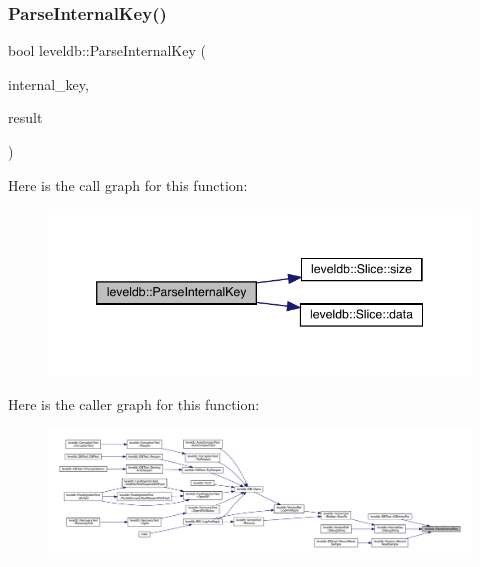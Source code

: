 \subsubsection{\texorpdfstring{ParseInternalKey()}{ParseInternalKey()}}
{\footnotesize\ttfamily bool leveldb\+::\+Parse\+Internal\+Key (\begin{DoxyParamCaption}\item[{const \mbox{\hyperlink{classleveldb_1_1_slice}{Slice}} \&}]{internal\+\_\+key,  }\item[{\mbox{\hyperlink{structleveldb_1_1_parsed_internal_key}{Parsed\+Internal\+Key}} $\ast$}]{result }\end{DoxyParamCaption})\hspace{0.3cm}{\ttfamily [inline]}}

Here is the call graph for this function\+:
\nopagebreak
\begin{figure}[H]
\begin{center}
\leavevmode
\includegraphics[width=346pt]{namespaceleveldb_a5a173b622e86c7a2f9beae3ac8818ac3_cgraph}
\end{center}
\end{figure}
Here is the caller graph for this function\+:
\nopagebreak
\begin{figure}[H]
\begin{center}
\leavevmode
\includegraphics[width=350pt]{namespaceleveldb_a5a173b622e86c7a2f9beae3ac8818ac3_icgraph}
\end{center}
\end{figure}
\mbox{\label{namespaceleveldb_a2d2b5dcaccd555df746cc89ffcd9cd05}} 
